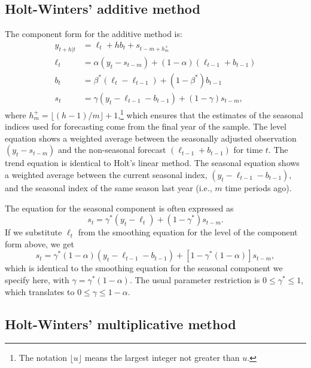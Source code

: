 \documentclass[]{book}
\let\rmarkdownfootnote\footnote%
\def\footnote{\protect\rmarkdownfootnote}
\begin{document}
\hypertarget{holt-winters-additive-method}{%
\subsection*{Holt-Winters' additive method}\label{holt-winters-additive-method}}

The component form for the additive method is:
\begin{align*}
  \hat{y}_{t+h|t} &= \ell_{t} + hb_{t} + s_{t-m+h_{m}^{+}} \\
  \ell_{t} &= \alpha(y_{t} - s_{t-m}) + (1 - \alpha)(\ell_{t-1} + b_{t-1})\\
  b_{t} &= \beta^*(\ell_{t} - \ell_{t-1}) + (1 - \beta^*)b_{t-1}\\
  s_{t} &= \gamma (y_{t}-\ell_{t-1}-b_{t-1}) + (1-\gamma)s_{t-m},
\end{align*}
where \(h_{m}^{+}=\lfloor(h-1)/m\rfloor+1\),\footnote{The notation \(\lfloor u \rfloor\) means the largest integer not greater than \(u\).} which ensures that the estimates of the seasonal indices used for forecasting come from the final year of the sample. The level equation shows a weighted average between the seasonally adjusted observation \((y_{t} - s_{t-m})\) and the non-seasonal forecast \((\ell_{t-1}+b_{t-1})\) for time \(t\). The trend equation is identical to Holt's linear method. The seasonal equation shows a weighted average between the current seasonal index, \((y_{t}-\ell_{t-1}-b_{t-1})\), and the seasonal index of the same season last year (i.e., \(m\) time periods ago).

The equation for the seasonal component is often expressed as
\[
 s_{t} = \gamma^* (y_{t}-\ell_{t})+ (1-\gamma^*)s_{t-m}.
\]
If we substitute \(\ell_t\) from the smoothing equation for the level of the component form above, we get
\[
 s_{t} = \gamma^*(1-\alpha) (y_{t}-\ell_{t-1}-b_{t-1})+ [1-\gamma^*(1-\alpha)]s_{t-m},
\]
which is identical to the smoothing equation for the seasonal component we specify here, with \(\gamma=\gamma^*(1-\alpha)\). The usual parameter restriction is \(0\le\gamma^*\le1\), which translates to \(0\le\gamma\le 1-\alpha\).

\hypertarget{holt-winters-multiplicative-method}{%
\subsection*{Holt-Winters' multiplicative method}\label{holt-winters-multiplicative-method}}
\end{document}
